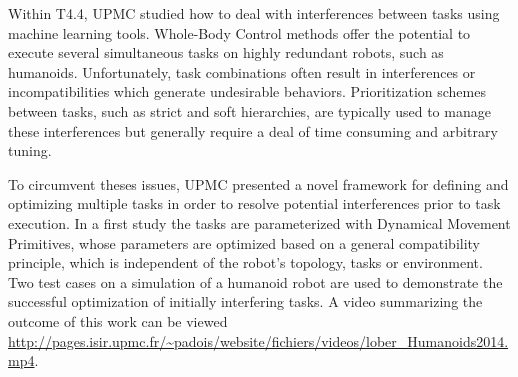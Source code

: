

Within T4.4, UPMC studied how to deal with interferences between tasks using
machine learning tools. Whole-Body Control methods offer the potential to
execute several simultaneous tasks on highly redundant robots, such as
humanoids. Unfortunately, task combinations often result in interferences or
incompatibilities which generate undesirable behaviors. Prioritization schemes
between tasks, such as strict and soft hierarchies, are typically used to manage
these interferences but generally require a deal of time consuming and arbitrary
tuning.

To circumvent theses issues, UPMC presented a novel framework for defining and
optimizing multiple tasks in order to resolve potential interferences prior to
task execution. In a first study \cite{lober-HUMANOIDS2014} the tasks are
parameterized with Dynamical Movement Primitives, whose parameters are optimized
based on a general compatibility principle, which is independent of the robot’s
topology, tasks or environment. Two test cases on a simulation of a humanoid
robot are used to demonstrate the successful optimization of initially
interfering tasks. A video summarizing the outcome of this work can be viewed
\url{http://pages.isir.upmc.fr/~padois/website/fichiers/videos/lober_Humanoids2014.mp4}.

